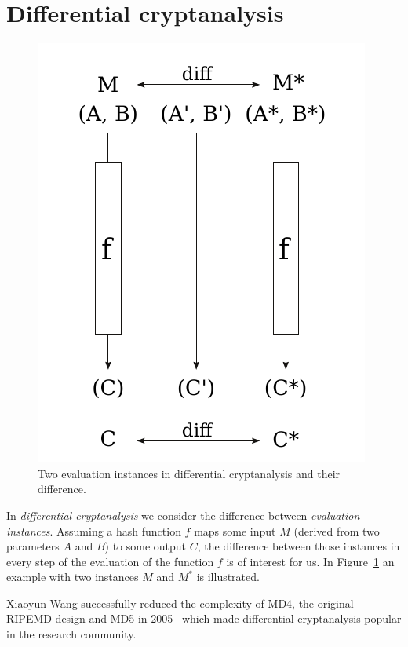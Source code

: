\section{Differential cryptanalysis}
\label{sec:differential}
%
\begin{figure}[t]
  \begin{center}
    \includegraphics{img/diff_cryptanalysis.pdf}
    \caption{Two evaluation instances in differential cryptanalysis and their difference.}
    \label{fig:diff_cryptanalysis}
  \end{center}
\end{figure}

In \emph{differential cryptanalysis} we consider the difference between \emph{evaluation instances}. Assuming a hash function $f$ maps some input $M$ (derived from two parameters $A$ and $B$) to some output $C$, the difference between those instances in every step of the evaluation of the function $f$ is of interest for us. In Figure~\ref{fig:diff_cryptanalysis} an example with two instances $M$ and $M^*$ is illustrated.

Xiaoyun Wang successfully reduced the complexity of MD4, the original RIPEMD design and MD5 in 2005~\cite{Cry10} which made differential cryptanalysis popular in the research community.

